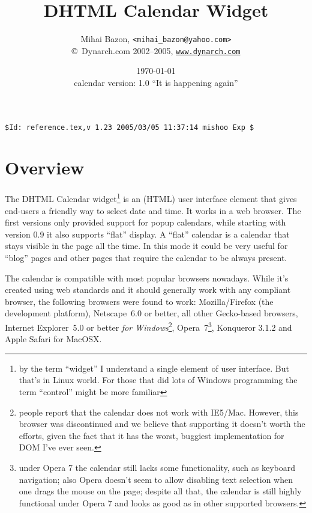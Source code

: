 \documentclass[a4paper,twoside,10pt]{dynadoc}
\title{DHTML Calendar Widget}
\author{Mihai Bazon, \texttt{<mihai\_bazon@yahoo.com>}\\
\copyright\ Dynarch.com 2002--2005, \href{http://www.dynarch.com/}{\texttt{www.dynarch.com}}}
\date{\today\\\vspace{0.2ex}
{\small calendar version: 1.0 ``It is happening again''}
}
\begin{document}
\maketitle

{\small\verb|$Id: reference.tex,v 1.23 2005/03/05 11:37:14 mishoo Exp $|}
{\begin{small}\begin{quote}
{\begin{flushright}
\noindent
\end{flushright}}
\end{quote}\end{small}}
\tableofcontents


\section{Overview}

The DHTML Calendar widget\footnote
        {
        by the term ``widget'' I understand a single element of user interface.
        But that's in Linux world.  For those that did lots of Windows
        programming the term ``control'' might be more familiar
        }
is an (HTML) user interface element that gives end-users a friendly way to
select date and time.  It works in a web browser.  The first versions only provided
support for popup calendars, while starting with version 0.9 it also supports
``flat'' display.  A ``flat'' calendar is a calendar that stays visible in the
page all the time.  In this mode it could be very useful for ``blog'' pages and
other pages that require the calendar to be always present.

The calendar is compatible with most popular browsers nowadays.  While it's
created using web standards and it should generally work with any compliant
browser, the following browsers were found to work: Mozilla/Firefox (the
development platform), Netscape~6.0 or better, all other Gecko-based browsers,
Internet Explorer~5.0 or better \emph{for Windows}\footnote{people report that the calendar does
not work with IE5/Mac.  However, this browser was discontinued and we
believe that supporting it doesn't worth the efforts, given the fact that
it has the worst, buggiest implementation for DOM I've ever seen.}, Opera~7\footnote
        { under Opera 7 the calendar still lacks some functionality, such as
        keyboard navigation; also Opera doesn't seem to allow disabling text
        selection when one drags the mouse on the page; despite all that, the
        calendar is still highly functional under Opera 7 and looks as good as
        in other supported browsers. }, Konqueror 3.1.2 and Apple Safari for
MacOSX.
\end{document}
